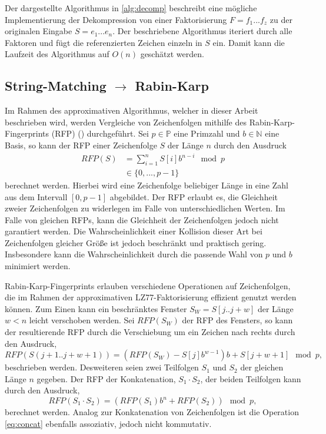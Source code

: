Der dargestellte Algorithmus in \ref{alg:decomp} beschreibt eine mögliche Implementierung der Dekompression von einer Faktorisierung $F=f_1...f_z$ zu der originalen Eingabe
$S=e_1...e_n$. Der beschriebene Algorithmus iteriert durch alle Faktoren und fügt die referenzierten Zeichen einzeln in $S$ ein. Damit kann die Laufzeit des 
Algorithmus auf $O(n)$ geschätzt werden.

\subsection{String-Matching $\rightarrow$ Rabin-Karp}
Im Rahmen des approximativen Algorithmus, welcher in dieser Arbeit beschrieben wird, werden Vergleiche von Zeichenfolgen mithilfe des Rabin-Karp-Fingerprints (RFP) (\cite{rfp})
durchgeführt. Sei
$p\in \mathbb{P}$ eine Primzahl und $b\in \mathbb{N}$ eine Basis, so kann der RFP einer Zeichenfolge $S$ der Länge $n$ durch den Ausdruck
\begin{equation}
    \begin{split}
    RFP(S) &= \sum_{i=1}^{n} S[i]b^{n-i} \mod p \\
    &\in \{0,...,p-1\}
    \end{split}
\end{equation}
berechnet werden. Hierbei wird eine Zeichenfolge beliebiger Länge in eine Zahl aus dem Intervall $[0,p-1]$ abgebildet. Der RFP erlaubt es, die Gleichheit zweier Zeichenfolgen zu widerlegen
im Falle von unterschiedlichen Werten. Im Falle von gleichen RFPs, kann die Gleichheit der Zeichenfolgen jedoch nicht garantiert werden. Die Wahrscheinlichkeit einer Kollision 
dieser Art bei Zeichenfolgen gleicher Größe ist jedoch beschränkt und praktisch gering. Insbesondere kann die Wahrscheinlichkeit durch die passende Wahl von $p$ und $b$ 
minimiert werden.

Rabin-Karp-Fingerprints erlauben verschiedene Operationen auf Zeichenfolgen, die im Rahmen der approximativen LZ77-Faktorisierung effizient genutzt werden können. Zum Einen kann ein
beschränktes Fenster $S_{W} = S[j..j+w]$ der Länge $w<n$ leicht verschoben werden. Sei $RFP(S_{W})$ der RFP des Fensters, so kann der resultierende RFP durch die Verschiebung um 
ein Zeichen nach rechts durch den Ausdruck,
\begin{equation} \label{eq:shift}
    RFP(S(j+1..j+w+1)) = (RFP(S_W) - S[j]b^{w-1})b + S[j+w+1] \mod p,
\end{equation}
beschrieben werden. Desweiteren seien zwei Teilfolgen $S_1$ und $S_2$ der gleichen Länge $n$ gegeben. Der RFP der Konkatenation, $S_1\cdot S_2$, der beiden Teilfolgen kann durch den Ausdruck,
\begin{equation} \label{eq:concat}
    RFP(S_1\cdot S_2) = (RFP(S_1)b^n + RFP(S_2)) \mod p,
\end{equation}
berechnet werden. Analog zur Konkatenation von Zeichenfolgen ist die Operation \ref{eq:concat} ebenfalls assoziativ, jedoch nicht kommutativ.


